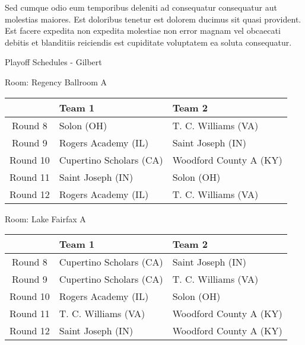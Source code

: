 \documentclass{article}%
\begin{document}
\newline%
Sed cumque odio eum temporibus deleniti ad consequatur consequatur aut molestias maiores. Est doloribus tenetur est dolorem ducimus sit quasi provident. Est facere expedita non expedita molestiae non error magnam vel obcaecati debitis et blanditiis reiciendis est cupiditate voluptatem ea soluta consequatur.%
\newpage%
\begin{center}%
\begin{Huge}%
Playoff Schedules {-} Gilbert%
\end{Huge}%
\end{center}%
\begin{flushleft}%
\begin{Large}%
Room: Regency Ballroom A%
\end{Large}%
\end{flushleft}%
\begin{tabularx}{\textwidth}{|c|Y|Y|}%
\hline%
&Team 1&Team 2\\%
\hline%
Round 8&Solon (OH)&T. C. Williams (VA)\\%
Round 9&Rogers Academy (IL)&Saint Joseph (IN)\\%
Round 10&Cupertino Scholars (CA)&Woodford County A (KY)\\%
Round 11&Saint Joseph (IN)&Solon (OH)\\%
Round 12&Rogers Academy (IL)&T. C. Williams (VA)\\%
\hline%
\end{tabularx}%
\vspace*{8pt}%
\linebreak%
\begin{flushleft}%
\begin{Large}%
Room: Lake Fairfax A%
\end{Large}%
\end{flushleft}%
\begin{tabularx}{\textwidth}{|c|Y|Y|}%
\hline%
&Team 1&Team 2\\%
\hline%
Round 8&Cupertino Scholars (CA)&Saint Joseph (IN)\\%
Round 9&Cupertino Scholars (CA)&T. C. Williams (VA)\\%
Round 10&Rogers Academy (IL)&Solon (OH)\\%
Round 11&T. C. Williams (VA)&Woodford County A (KY)\\%
Round 12&Saint Joseph (IN)&Woodford County A (KY)\\%
\hline%
\end{tabularx}%
\vspace*{8pt}%
\end{document}
